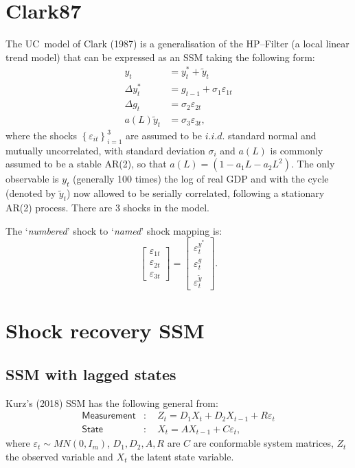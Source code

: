 \documentclass[a4paper,12pt]{article}
\newcommand{\bsq}{\begin{subequations}}\newcommand{\esq}{\end{subequations}}
\begin{document}
\section{Clark87}

The UC\ model of Clark (1987) is a generalisation of the HP--Filter (a local
linear trend model) that can be expressed as an SSM taking the following
form:\bsq\label{clark0}%
\begin{align}
y_{t}& =y_{t}^{\ast }+\tilde{y}_{t} \\
\Delta y_{t}^{\ast }& =g_{t-1}+\sigma _{1}\varepsilon _{1t} \\
\Delta g_{t}& =\sigma _{2}\varepsilon _{2t} \\
a(L)\tilde{y}_{t}& =\sigma _{3}\varepsilon _{3t},
\end{align}%
\esq where the shocks $\left\{ \varepsilon _{it}\right\} _{i=1}^{3}$ are
assumed to be $i.i.d.$ standard normal and mutually uncorrelated, with
standard deviation $\sigma _{i}$ and $a(L)$ is commonly assumed to be a
stable AR(2), so that $a(L)=(1-a_{1}L-a_{2}L^{2})$. The only observable is $%
y_{t}$ (generally 100 times) the log of real GDP and with the cycle (denoted
by $\tilde{y}_{t}$) now allowed to be serially correlated, following a
stationary AR(2) process. There are 3 shocks in the model.

The `\emph{numbered}' shock to `\emph{named}' shock mapping is:%
\begin{equation}
\begin{bmatrix}
\varepsilon _{1t} \\ 
\varepsilon _{2t} \\ 
\varepsilon _{3t}%
\end{bmatrix}%
=%
\begin{bmatrix}
\varepsilon _{t}^{y^{\ast }} \\ 
\varepsilon _{t}^{g} \\ 
\varepsilon _{t}^{\tilde{y}}%
\end{bmatrix}%
.
\end{equation}

\section{Shock recovery SSM}

\subsection{SSM with lagged states}

Kurz's (2018) SSM has the following general from:\bsq\label{SSM}%
\begin{align}
\mathsf{Measurement}& :\quad Z_{t}=D_{1}X_{t}+D_{2}X_{t-1}+R\varepsilon _{t}
\label{ssm1} \\
\mathsf{State}& :\quad X_{t}=AX_{t-1}+C\varepsilon _{t},  \label{ssm2}
\end{align}%
\esq where $\varepsilon _{t}\sim MN(0,I_{m})$, $D_{1},D_{2},A,R$ are $C$ are
conformable system matrices, $Z_{t}$ the observed variable and $X_{t}$ the
latent state variable.
\end{document}
